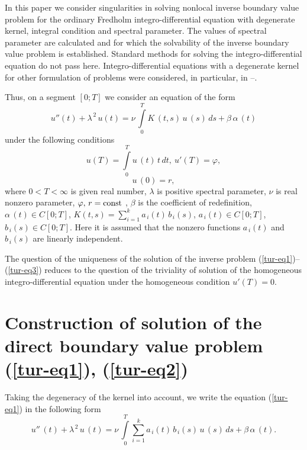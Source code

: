 ﻿\documentclass[
11pt,%
tightenlines,%
twoside,%
onecolumn,%
nofloats,%
nobibnotes,%
nofootinbib,%
superscriptaddress,%
noshowpacs,%
centertags]%
{revtex4}
\begin{document}
In this paper we consider singularities in solving nonlocal inverse boundary value problem for the ordinary Fredholm integro-differential equation with degenerate kernel, integral condition and spectral parameter. The values of spectral parameter are calculated and for which the solvability of the inverse boundary value problem is established. Standard methods for solving the integro-differential equation do not pass here. Integro-differential equations with a degenerate kernel for other formulation of problems were considered, in particular, in \cite{tur10}--\cite{tur14}. 

Thus, on a segment $[0 ; T]$ we consider an equation of the form
\begin{equation} \label{tur-eq1}
u'' (t)+\lambda^{\, 2} \, u (t)=\nu \, \int \limits_{0}^{T} K \, (t , s) \, u \, (s) \, d s+\beta \, \alpha \, (t)
\end{equation}
under the following conditions
\begin{equation} \label{tur-eq2}
u (T)=\int \limits_{0}^{T} u \, (t) \, t \, d t , \: u' (T)=\varphi ,
\end{equation}
\begin{equation} \label{tur-eq3}
 u \, (0)=r ,
\end{equation}
where $0<T< \infty$ is given real number, $\lambda$ is positive spectral parameter, $\nu$ is real nonzero parameter, $\varphi , \, r= {\rm const}$ ,  $\beta$ is the coefficient of redefinition, $\alpha \, (t)  \in C [0 ; T]$, $K (t , s)=\sum \limits_{i=1}^{k} a_{\, i} (t) \, b_{\, i} (s)$, $a_{\, i} (t)  \in C [0 ; T]$, $b_{\, i} (s) \in C [0 ; T ]$. Here it is assumed that the nonzero functions $a_{\, i} (t)$ and  $b_{\, i} (s)$ are linearly independent.

The question of the uniqueness of the solution of the inverse problem (\ref{tur-eq1})--(\ref{tur-eq3}) reduces to the question of the triviality of solution of the homogeneous integro-differential equation under the homogeneous condition  $u' (T)=0$.

\section{Construction of solution of the direct boundary value problem (\ref{tur-eq1}), (\ref{tur-eq2})}

Taking the degeneracy of the kernel into account, we write the equation (\ref{tur-eq1}) in the following form
\begin{equation} \label{tur-eq4}	
u'' \, (t)+\lambda^{\, 2} \, u \, (t)=\nu \, \int \limits_{0}^T \sum \limits_{i=1}^{k} a_{\, i} (t) \, b_{\, i} (s) \, u \, (s) \, d s+\beta \, \alpha \, (t) .
\end{equation}
\end{document}
